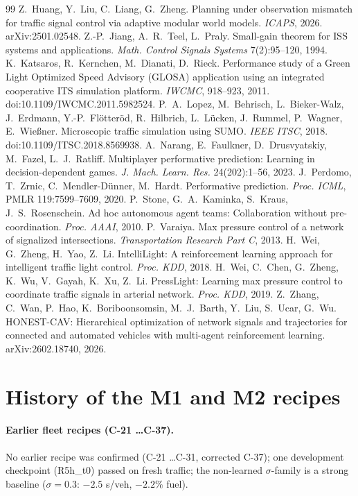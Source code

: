 \documentclass[11pt]{article}
\begin{document}
\begin{thebibliography}{99}
 Z.~Huang, Y.~Liu, C.~Liang, G.~Zheng. Planning under observation mismatch for traffic signal control via adaptive modular world models. \emph{ICAPS}, 2026. arXiv:2501.02548.
 Z.-P.~Jiang, A.~R.~Teel, L.~Praly. Small-gain theorem for ISS systems and applications. \emph{Math. Control Signals Systems} 7(2):95--120, 1994.
 K.~Katsaros, R.~Kernchen, M.~Dianati, D.~Rieck. Performance study of a Green Light Optimized Speed Advisory (GLOSA) application using an integrated cooperative ITS simulation platform. \emph{IWCMC}, 918--923, 2011. doi:10.1109/IWCMC.2011.5982524.
 P.~A.~Lopez, M.~Behrisch, L.~Bieker-Walz, J.~Erdmann, Y.-P.~Fl\"otter\"od, R.~Hilbrich, L.~L\"ucken, J.~Rummel, P.~Wagner, E.~Wie{\ss}ner. Microscopic traffic simulation using SUMO. \emph{IEEE ITSC}, 2018. doi:10.1109/ITSC.2018.8569938.
 A.~Narang, E.~Faulkner, D.~Drusvyatskiy, M.~Fazel, L.~J.~Ratliff. Multiplayer performative prediction: Learning in decision-dependent games. \emph{J. Mach. Learn. Res.} 24(202):1--56, 2023.
 J.~Perdomo, T.~Zrnic, C.~Mendler-D\"unner, M.~Hardt. Performative prediction. \emph{Proc. ICML}, PMLR 119:7599--7609, 2020.
 P.~Stone, G.~A.~Kaminka, S.~Kraus, J.~S.~Rosenschein. Ad hoc autonomous agent teams: Collaboration without pre-coordination. \emph{Proc. AAAI}, 2010.
 P.~Varaiya. Max pressure control of a network of signalized intersections. \emph{Transportation Research Part C}, 2013.
 H.~Wei, G.~Zheng, H.~Yao, Z.~Li. IntelliLight: A reinforcement learning approach for intelligent traffic light control. \emph{Proc. KDD}, 2018.
 H.~Wei, C.~Chen, G.~Zheng, K.~Wu, V.~Gayah, K.~Xu, Z.~Li. PressLight: Learning max pressure control to coordinate traffic signals in arterial network. \emph{Proc. KDD}, 2019.
 Z.~Zhang, C.~Wan, P.~Hao, K.~Boriboonsomsin, M.~J.~Barth, Y.~Liu, S.~Ucar, G.~Wu. HONEST-CAV: Hierarchical optimization of network signals and trajectories for connected and automated vehicles with multi-agent reinforcement learning. arXiv:2602.18740, 2026.
\end{thebibliography}

\appendix
\section{History of the M1 and M2 recipes}
\paragraph{Earlier fleet recipes (C-21 \dots C-37).} No earlier recipe was confirmed (C-21 \dots C-31, corrected C-37); one development checkpoint (R5h\_t0)
passed on fresh traffic; the non-learned $\sigma$-family is a strong baseline ($\sigma=0.3$: $-2.5$ s/veh, $-2.2\%$ fuel).
\end{document}
